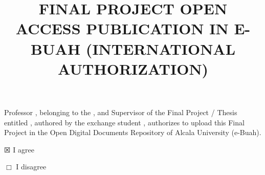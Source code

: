\documentclass[12pt,a4paper,oneside]{article}
\title{FINAL PROJECT OPEN ACCESS PUBLICATION IN E-BUAH (INTERNATIONAL AUTHORIZATION)}             %
\date{}                                            %
\begin{document}

{\large
\maketitle 

\thispagestyle{empty}


Professor \myAcademicTutorFullName, belonging to the \myAcademicTutorForeignUniversity, and Supervisor of the Final Project / Thesis entitled \textit{\myBookTitleEnglish{}}, authored by the exchange student \myAuthorFullName{}, authorizes to upload this Final Project in the Open Digital Documents Repository of Alcala University (e-Buah).

\vspace{0.5cm}

$\XBox$ I agree

\vspace{0.5cm}

$\Box$ I disagree


{}

\vspace{2cm}


}
\end{document}
